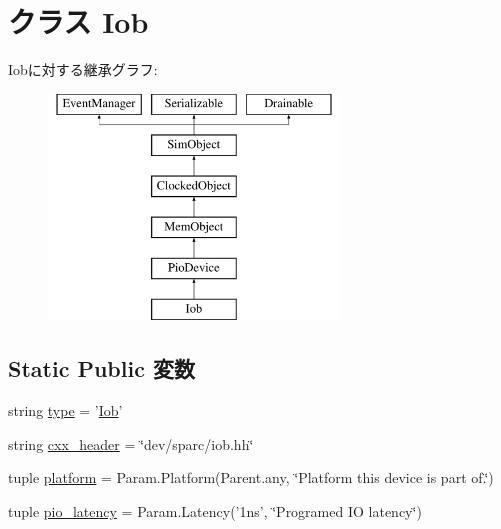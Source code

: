 \hypertarget{classT1000_1_1Iob}{
\section{クラス Iob}
\label{classT1000_1_1Iob}
}
Iobに対する継承グラフ:\begin{figure}[H]
\begin{center}
\leavevmode
\includegraphics[height=6cm]{classT1000_1_1Iob}
\end{center}
\end{figure}
\subsection*{Static Public 変数}
\begin{DoxyCompactItemize}
\item 
string \hyperlink{classT1000_1_1Iob_acce15679d830831b0bbe8ebc2a60b2ca}{type} = '\hyperlink{classT1000_1_1Iob}{Iob}'
\item 
string \hyperlink{classT1000_1_1Iob_a17da7064bc5c518791f0c891eff05fda}{cxx\_\-header} = \char`\"{}dev/sparc/iob.hh\char`\"{}
\item 
tuple \hyperlink{classT1000_1_1Iob_ae6d09ca44893db6cdb66d62deaa1aefd}{platform} = Param.Platform(Parent.any, \char`\"{}Platform this device is part of.\char`\"{})
\item 
tuple \hyperlink{classT1000_1_1Iob_ac3f272675842a6662ce8782e10fdba39}{pio\_\-latency} = Param.Latency('1ns', \char`\"{}Programed IO latency\char`\"{})
\end{DoxyCompactItemize}


